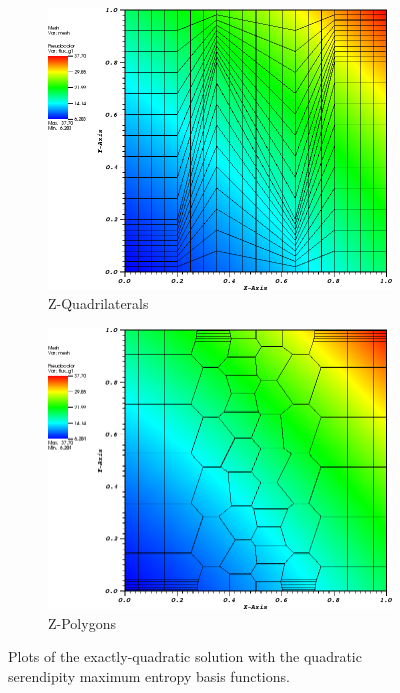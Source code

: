 \begin{figure}
{\begin{subfigure}[b]{0.465\textwidth}
	\end{subfigure}
}
\vspace{3mm}
{
	\begin{subfigure}[b]{0.465\textwidth}
		\centering
		\label{subfig::z_quad_me_k2_lin_sol}
		\includegraphics[width=\textwidth]{figures/sec_BF/quad_sol_zquad.png}
		\caption{Z-Quadrilaterals}
	\end{subfigure}
	\hfill
	\begin{subfigure}[b]{0.465\textwidth}
		\centering
		\label{subfig::z_poly_me_k2_lin_sol}
		\includegraphics[width=\textwidth]{figures/sec_BF/quad_sol_zpoly.png}
		\caption{Z-Polygons}
	\end{subfigure}
}
\caption{Plots of the exactly-quadratic solution with the quadratic serendipity maximum entropy basis functions.}
\label{fig::BF_Results_quad_sol}
\end{figure}

